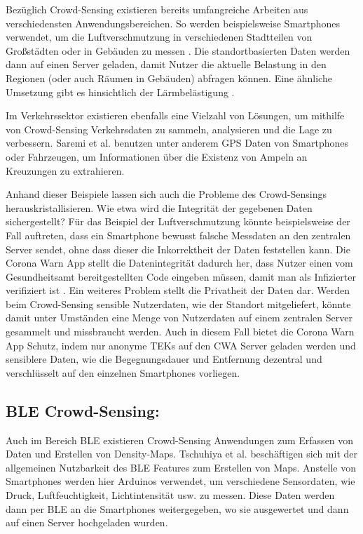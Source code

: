 \documentclass[conference,compsoc]{IEEEtran}
\begin{document}
Bezüglich Crowd-Sensing existieren bereits umfangreiche Arbeiten aus verschiedensten Anwendungsbereichen. 
So werden beispielsweise Smartphones verwendet, um die Luftverschmutzung in verschiedenen Stadtteilen von Großstädten oder in Gebäuden zu messen \cite{AirQuality}. 
Die standortbasierten Daten werden dann auf einen Server geladen, damit Nutzer die aktuelle Belastung in den Regionen (oder auch Räumen in Gebäuden) abfragen können. 
Eine ähnliche Umsetzung gibt es hinsichtlich der Lärmbelästigung \cite{NoiseSense}. 

Im Verkehrssektor existieren ebenfalls eine Vielzahl von Lösungen, um mithilfe von Crowd-Sensing Verkehrsdaten zu sammeln, analysieren und die Lage zu verbessern. 
Saremi et al. \cite{TrafficRegulators} benutzen unter anderem GPS Daten von Smartphones oder Fahrzeugen, um Informationen über die Existenz von Ampeln an Kreuzungen zu extrahieren. 

Anhand dieser Beispiele lassen sich auch die Probleme des Crowd-Sensings herauskristallisieren. 
Wie etwa wird die Integrität der gegebenen Daten sichergestellt?
Für das Beispiel der Luftverschmutzung könnte beispielsweise der Fall auftreten, dass ein Smartphone bewusst falsche Messdaten an den zentralen Server sendet, ohne dass dieser die Inkorrektheit der Daten feststellen kann.
Die Corona Warn App stellt die Datenintegrität dadurch her, dass Nutzer einen vom Gesundheitsamt bereitgestellten Code eingeben müssen, damit man als Infizierter verifiziert ist \cite{CWA}.
Ein weiteres Problem stellt die Privatheit der Daten dar. 
Werden beim Crowd-Sensing sensible Nutzerdaten, wie der Standort mitgeliefert, könnte damit unter Umständen eine Menge von Nutzerdaten auf einem zentralen Server gesammelt und missbraucht werden.
Auch in diesem Fall bietet die Corona Warn App Schutz, indem nur anonyme TEKs auf den CWA Server geladen werden und sensiblere Daten, wie die Begegnungsdauer und Entfernung dezentral und verschlüsselt auf den einzelnen Smartphones vorliegen.

\subsection{BLE Crowd-Sensing:}
Auch im Bereich BLE existieren Crowd-Sensing Anwendungen zum Erfassen von Daten und Erstellen von Density-Maps. 
Tschuhiya et al. \cite{BLESensorDevices} beschäftigen sich mit der allgemeinen Nutzbarkeit des BLE Features zum Erstellen von Maps. 
Anstelle von Smartphones werden hier Arduinos verwendet, um verschiedene Sensordaten, wie Druck, Luftfeuchtigkeit, Lichtintensität usw. zu messen. 
Diese Daten werden dann per BLE an die Smartphones weitergegeben, wo sie ausgewertet und dann auf einen Server hochgeladen wurden. 
\end{document}
